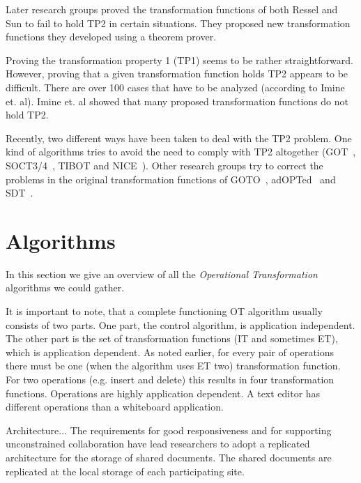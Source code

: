\documentclass[11pt,a4paper]{article}
\begin{document}
Later research groups\cite{imine03}\cite{imine04} proved the transformation functions of both Ressel\cite{ressel96} and Sun\cite{sun98a} to fail to hold TP2 in certain situations. They proposed new transformation functions they developed using a theorem prover. 

Proving the transformation property 1 (TP1) seems to be rather straightforward. However, proving that a given transformation function holds TP2 appears to be difficult. There are over 100 cases that have to be analyzed (according to {Imine et. al}\cite{imine04}). Imine et. al showed that many proposed transformation functions do not hold TP2. 

Recently, two different ways have been taken to deal with the TP2 problem. One kind of algorithms tries to avoid the need to comply with TP2 altogether (GOT~\cite{sun98a}, SOCT3/4~\cite{suleiman00}, TIBOT\cite{tibot} and NICE~\cite{sun02}). Other research groups try to correct the problems in the original transformation functions of GOTO~\cite{sun98b}, adOPTed~\cite{ressel96} and SDT~\cite{sdt}. 


\section{Algorithms}
\label{algos}
In this section we give an overview of all the \emph{Operational Transformation} algorithms we could gather.

It is important to note, that a complete functioning OT algorithm usually consists of two parts. One part, the control algorithm, is application independent. The other part is the set of transformation functions (IT and sometimes ET), which is application dependent. As noted earlier, for every pair of operations there must be one (when the algorithm uses ET two) transformation function. For two operations (e.g. insert and delete) this results in four transformation functions. Operations are highly application dependent. A text editor has different operations than a whiteboard application.

Architecture...
The requirements for good responsiveness and for supporting unconstrained collaboration have lead researchers to adopt a replicated architecture for the storage of shared documents. The shared documents are replicated at the local storage of each participating site.















\end{document}
